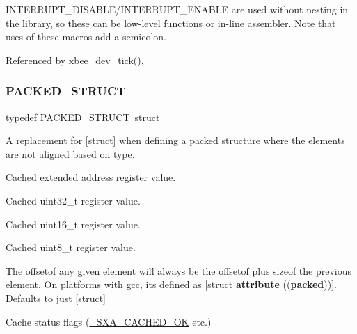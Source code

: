 I\+N\+T\+E\+R\+R\+U\+P\+T\+\_\+\+D\+I\+S\+A\+B\+L\+E/\+I\+N\+T\+E\+R\+R\+U\+P\+T\+\_\+\+E\+N\+A\+B\+LE are used without nesting in the library, so these can be low-\/level functions or in-\/line assembler. Note that uses of these macros add a semicolon. 

Referenced by xbee\+\_\+dev\+\_\+tick().

\mbox{\label{group__hal_ga4233297bd31be5c273d4fb0758cc54d7}} 
\subsubsection{\texorpdfstring{P\+A\+C\+K\+E\+D\+\_\+\+S\+T\+R\+U\+CT}{PACKED\_STRUCT}}
{\footnotesize\ttfamily typedef P\+A\+C\+K\+E\+D\+\_\+\+S\+T\+R\+U\+CT~struct}



A replacement for \mbox{[}struct\mbox{]} when defining a packed structure where the elements are not aligned based on type. 

Cached extended address register value.

Cached uint32\+\_\+t register value.

Cached uint16\+\_\+t register value.

Cached uint8\+\_\+t register value.

The offsetof any given element will always be the offsetof plus sizeof the previous element. On platforms with gcc, it\textquotesingle{}s defined as \mbox{[}struct {\bfseries attribute} (({\bfseries packed}))\mbox{]}. Defaults to just \mbox{[}struct\mbox{]}

Cache status flags (\hyperlink{group___s_x_a_gga0411cd49bb5b71852cecd93bcbf0ca2da54498f64b3ad7c2be423d32b45deac04}{\+\_\+\+S\+X\+A\+\_\+\+C\+A\+C\+H\+E\+D\+\_\+\+OK} etc.) \mbox{\label{group__hal_ga336bff4f4a6012aacc4468132bbd3d7f}} 
